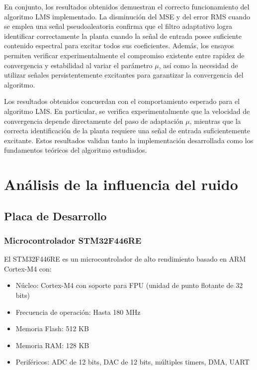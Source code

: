 \documentclass[12pt]{article}
\begin{document}
			En conjunto, los resultados obtenidos demuestran el correcto funcionamiento del algoritmo LMS implementado. La disminución del MSE y del error RMS cuando se emplea una señal pseudoaleatoria confirma que el filtro adaptativo logra identificar correctamente la planta cuando la señal de entrada posee suficiente contenido espectral para excitar todos sus coeficientes. Además, los ensayos permiten verificar experimentalmente el compromiso existente entre rapidez de convergencia y estabilidad al variar el parámetro $\mu$, así como la necesidad de utilizar señales persistentemente excitantes para garantizar la convergencia del algoritmo.

			Los resultados obtenidos concuerdan con el comportamiento esperado para el algoritmo LMS. En particular, se verifica experimentalmente que la velocidad de convergencia depende directamente del paso de adaptación $\mu$, mientras que la correcta identificación de la planta requiere una señal de entrada suficientemente excitante. Estos resultados validan tanto la implementación desarrollada como los fundamentos teóricos del algoritmo estudiados.
	
	\section{Análisis de la influencia del ruido}
		
		\subsection{Placa de Desarrollo}

			\subsubsection{Microcontrolador STM32F446RE}

				El STM32F446RE es un microcontrolador de alto rendimiento basado en ARM Cortex-M4 con:

				\begin{itemize}
					\item Núcleo: Cortex-M4 con soporte para FPU (unidad de punto flotante de 32 bits)
					\item Frecuencia de operación: Hasta 180 MHz
					\item Memoria Flash: 512 KB
					\item Memoria RAM: 128 KB
					\item Periféricos: ADC de 12 bits, DAC de 12 bits, múltiples timers, DMA, UART
				\end{itemize}
\end{document}
